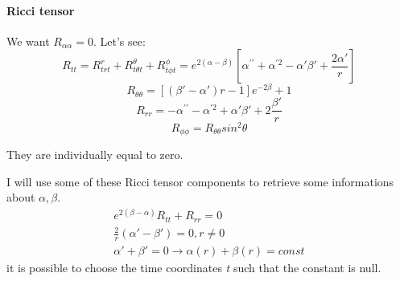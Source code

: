 \paragraph{Ricci tensor}
We want $R_{\alpha \alpha } = 0$. Let's see:
\begin{equation}
	R_{tt} = R^{r}_{trt} + R^{\theta }_{t\theta t} + R^{\phi }_{t\phi t} = e^{2\left( \alpha -\beta  \right)}\left[ \alpha^{\prime \prime } + \alpha ^{\prime 2} - \alpha '\beta ' +\frac{2\alpha '}{r}\right] 
\end{equation}
\begin{equation}
	R_{\theta \theta } = \left[ \left( \beta ' - \alpha '  \right)r-1\right] e^{-2\beta }+1
\end{equation}
\begin{equation}
R_{rr} = -\alpha^{\prime \prime } - \alpha ^{\prime 2} + \alpha ' \beta ' + 2 \frac{\beta '}{r}
\end{equation}
\begin{equation}
	R_{\phi \phi } = R_{\theta \theta }sin^{2}\theta 
\end{equation}

They are individually equal to zero.

I will use some of these Ricci tensor components to retrieve some informations about $\alpha, \beta $.
\begin{gather*}
e^{2\left( \beta -\alpha  \right)}R_{tt} + R_{rr} = 0 \\
\frac{2}{r}\left( \alpha '-\beta ' \right) = 0 , r\neq 0 \\
\alpha '+ \beta ' = 0 \to  \alpha \left( r \right)+\beta \left( r \right) = const
\end{gather*}
it is possible to choose the time coordinates \emph{t} such that the constant is null.

